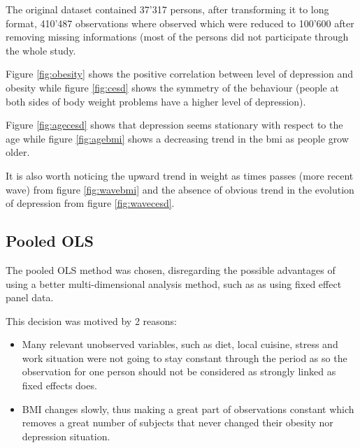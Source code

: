 The original dataset contained 37'317 persons, after transforming it to long format, 410'487 observations where observed which were reduced to 100'600 after removing missing informations (most of the persons did not participate through the whole study.

Figure \ref{fig:obesity} shows the positive correlation between level of depression and obesity while figure \ref{fig:cesd} shows the symmetry of the behaviour (people at both sides of body weight problems have a higher level of depression).

Figure \ref{fig:agecesd} shows that depression seems stationary with respect to the age while figure \ref{fig:agebmi} shows a decreasing trend in the bmi as people grow older.

It is also worth noticing the upward trend in weight as times passes (more recent wave) from figure \ref{fig:wavebmi} and the absence of obvious trend in the evolution of depression from figure \ref{fig:wavecesd}.

\subsection{Pooled OLS}
The pooled OLS method was chosen, disregarding the possible advantages of using a better multi-dimensional analysis method, such as as using fixed effect panel data.

This decision was motived by 2 reasons:
\begin{itemize}
\item Many relevant unobserved variables, such as diet, local cuisine, stress and work situation were not going to stay constant through the period as so the observation for one person should not be considered as strongly linked as fixed effects does.
\item BMI changes slowly, thus making a great part of observations constant which removes a great number of subjects that never changed their obesity nor depression situation.
\end{itemize}